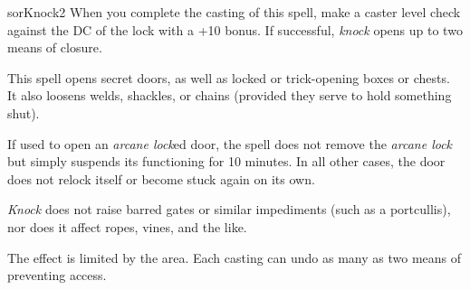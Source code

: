 \begin{spellcard}{sor}{Knock}{2}
  When you complete the casting of this spell, make a caster level check against the DC of the lock with a +10 bonus.
  If successful, \emph{knock} opens up to two means of closure.

  This spell opens secret doors, as well as locked or trick-opening boxes or chests.
  It also loosens welds, shackles, or chains (provided they serve to hold something shut).

  If used to open an \emph{arcane lock}ed door,
  the spell does not remove the \emph{arcane lock} but simply suspends its functioning for 10 minutes.
  In all other cases, the door does not relock itself or become stuck again on its own.

  \emph{Knock} does not raise barred gates or similar impediments (such as a portcullis),
  nor does it affect ropes, vines, and the like.

  The effect is limited by the area.
  Each casting can undo as many as two means of preventing access.
\end{spellcard}
